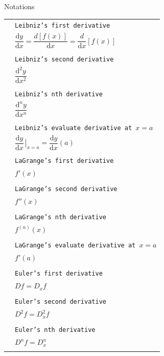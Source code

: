 \documentclass[10pt,landscape]{article}
\newcommand{\dd}{\mathrm{d}}
\newcommand{\dx}{\mathrm{d}x}
\newcommand{\dy}{\mathrm{d}y}
\newcommand{\dydx}{\dfrac{\mathrm{d}y}{\mathrm{d}x}}
\begin{document}
\begin{multicols}{3}
\begin{mysection}{Notations}
\begin{tabular}{@{}ll@{}}
& \texttt{Leibniz's first derivative} \\
& \qquad $\dfrac{\dy}{\dx} = \dfrac{d \left[f(x) \right]}{\dx}= \dfrac{d}{\dx} \left[f(x) \right]$\\
& \\
& \texttt{Leibniz's second derivative} \\
& \qquad $\dfrac{\dd^{2}y}{\dx^{2}}$\\
& \\
& \texttt{Leibniz's nth derivative} \\
& \qquad $\dfrac{\dd^{n}y}{\dx^{n}}$\\
& \\
& \texttt{Leibniz's evaluate derivative at $x=a$} \\
& \qquad $\dydx\left.{\!\!\frac{}{}}\right|_{x=a} = \dydx(a)$\\
& \\
& \texttt{LaGrange's first derivative} \\
& \qquad $f'(x)$\\
& \\
& \texttt{LaGrange's second derivative} \\
& \qquad $f''(x)$\\
& \\
& \texttt{LaGrange's nth derivative} \\
& \qquad $f^{(n)}(x)$\\
& \\
& \texttt{LaGrange's evaluate derivative at $x=a$} \\
& \qquad $f'(a)$\\
& \\
& \texttt{Euler's first derivative} \\
& \qquad $Df =D_{x}f $\\
& \\
& \texttt{Euler's second derivative} \\
& \qquad $D^{2}f=D_{x}^{2}f$\\
& \\
& \texttt{Euler's nth derivative} \\
& \qquad $D^{n}f= D_{x}^{n}$\\
& \\
\end{tabular}

\end{mysection}


\end{multicols}
\end{document}
